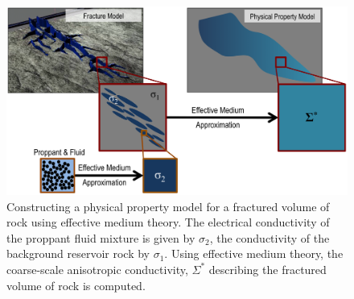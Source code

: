 \begin{figure}
    \begin{center}
    \includegraphics[width=\columnwidth]{figures/phys_prop_model/effective_medium_theory.png}
    \end{center}
\caption{
    Constructing a physical property model for a fractured volume of rock using
    effective medium theory. The electrical conductivity of the proppant fluid
    mixture is given by $\sigma_2$, the conductivity of the background reservoir
    rock by $\sigma_1$. Using effective medium theory, the coarse-scale anisotropic
    conductivity, $\Sigma^*$ describing the fractured volume of rock is computed.
}
\label{fig:effective_medium_theory}
\end{figure}
